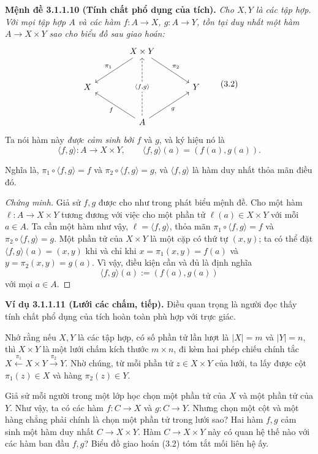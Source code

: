 \noindent\textbf{Mệnh đề 3.1.1.10 (Tính chất phổ dụng của tích).} \emph{Cho $X,Y$ là các tập hợp. Với mọi tập hợp $A$ và các hàm $f:A\to X$, $g:A\to Y$, tồn tại duy nhất một hàm $A\to X\times Y$ sao cho biểu đồ sau giao hoán:}
\begin{equation*}\begin{tikzcd}[column sep=large,row sep=large]
&X\times Y\arrow[dl,"\pi_1"']\arrow[dr,"\pi_2"]&\\
X&&Y\\
&A\arrow[ul,"f"]\arrow[ur,"g"']\arrow[uu,dashed,"{\langle f,g\rangle}" description]&
\end{tikzcd}\tag{3.2}\end{equation*}
Ta nói hàm này \emph{được cảm sinh bởi} $f$ và $g$, và ký hiệu nó là
\[\langle f,g\rangle:A\to X\times Y,\qquad \langle f,g\rangle(a)=(f(a),g(a)).\]

Nghĩa là, $\pi_1\circ\langle f,g\rangle=f$ và $\pi_2\circ\langle f,g\rangle=g$, và $\langle f,g\rangle$ là hàm duy nhất thỏa mãn điều đó.

\begin{proof}[Chứng minh]
Giả sử $f,g$ được cho như trong phát biểu mệnh đề. Cho một hàm $\ell:A\to X\times Y$ tương đương với việc cho một phần tử $\ell(a)\in X\times Y$ với mỗi $a\in A$. Ta cần một hàm như vậy, $\ell=\langle f,g\rangle$, thỏa mãn $\pi_1\circ\langle f,g\rangle=f$ và $\pi_2\circ\langle f,g\rangle=g$. Một phần tử của $X\times Y$ là một cặp có thứ tự $(x,y)$; ta có thể đặt $\langle f,g\rangle(a)=(x,y)$ khi và chỉ khi $x=\pi_1(x,y)=f(a)$ và $y=\pi_2(x,y)=g(a)$. Vì vậy, điều kiện cần và đủ là định nghĩa
\[\langle f,g\rangle(a):=(f(a),g(a))\]
với mọi $a\in A$.
\end{proof}

\noindent\textbf{Ví dụ 3.1.1.11 (Lưới các chấm, tiếp).} Điều quan trọng là người đọc thấy tính chất phổ dụng của tích hoàn toàn phù hợp với trực giác.

Nhớ rằng nếu $X,Y$ là các tập hợp, có số phần tử lần lượt là $|X|=m$ và $|Y|=n$, thì $X\times Y$ là một lưới chấm kích thước $m\times n$, đi kèm hai phép chiếu chính tắc $X\xleftarrow{\pi_1}X\times Y\xrightarrow{\pi_2}Y$. Nhờ chúng, từ mỗi phần tử $z\in X\times Y$ của lưới, ta lấy được cột $\pi_1(z)\in X$ và hàng $\pi_2(z)\in Y$.

Giả sử mỗi người trong một lớp học chọn một phần tử của $X$ và một phần tử của $Y$. Như vậy, ta có các hàm $f:C\to X$ và $g:C\to Y$. Nhưng chọn một cột và một hàng chẳng phải chính là chọn một phần tử trong lưới sao? Hai hàm $f,g$ cảm sinh một hàm duy nhất $C\to X\times Y$. Hàm $C\to X\times Y$ này có quan hệ thế nào với các hàm ban đầu $f,g$? Biểu đồ giao hoán (3.2) tóm tắt mối liên hệ ấy.

